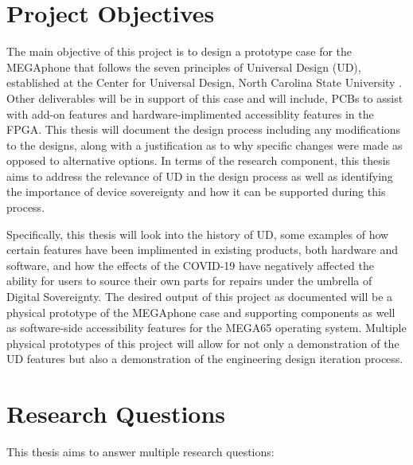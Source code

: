 \section{Project Objectives}

The main objective of this project is to design a prototype case for the MEGAphone that follows the seven principles of Universal Design (UD), established at the Center for Universal Design, North Carolina State University \cite{sevenprinciples}. 
Other deliverables will be in support of this case and will include, PCBs to assist with add-on features and hardware-implimented accessiblity features in the FPGA.
This thesis will document the design process including any modifications to the designs, along with a justification as to why specific changes were made as opposed to alternative options.
In terms of the research component, this thesis aims to address the relevance of UD in the design process as well as identifying the importance of device sovereignty and how it can be supported during this process.

Specifically, this thesis will look into the history of UD, some examples of how certain features have been implimented in existing products, both hardware and software, and how the effects of the COVID-19 have negatively affected the ability for users to source their own parts for repairs under the umbrella of Digital Sovereignty.
The desired output of this project as documented will be a physical prototype of the MEGAphone case and supporting components as well as software-side accessibility features for the MEGA65 operating system.
Multiple physical prototypes of this project will allow for not only a demonstration of the UD features but also a demonstration of the engineering design iteration process.
 
\section{Research Questions}

This thesis aims to answer multiple research questions:

